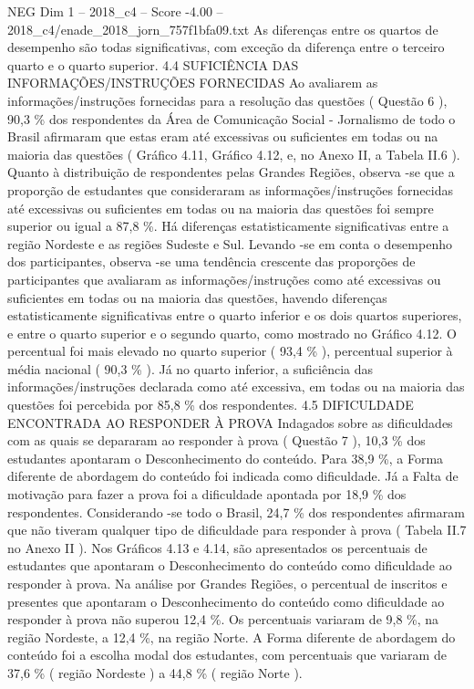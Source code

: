 \begin{textsample}{NEG Dim 1 – 2018\_c4 – Score -4.00 – 2018\_c4/enade\_2018\_jorn\_757f1bfa09.txt}
As diferenças entre os quartos de desempenho são todas significativas, com exceção da diferença entre o terceiro quarto e o quarto superior. 4.4 SUFICIÊNCIA DAS INFORMAÇÕES/INSTRUÇÕES FORNECIDAS Ao avaliarem as informações/instruções fornecidas para a resolução das questões ( Questão 6 ), 90,3 \% dos respondentes da Área de Comunicação Social - Jornalismo de todo o Brasil afirmaram que estas eram até excessivas ou suficientes em todas ou na maioria das questões ( Gráfico 4.11, Gráfico 4.12, e, no Anexo II, a Tabela II.6 ).
Quanto à distribuição de respondentes pelas Grandes Regiões, observa -se que a proporção de estudantes que consideraram as informações/instruções fornecidas até excessivas ou suficientes em todas ou na maioria das questões foi sempre superior ou igual a 87,8 \%.
Há diferenças estatisticamente significativas entre a região Nordeste e as regiões Sudeste e Sul.
Levando -se em conta o desempenho dos participantes, observa -se uma tendência crescente das proporções de participantes que avaliaram as informações/instruções como até excessivas ou suficientes em todas ou na maioria das questões, havendo diferenças estatisticamente significativas entre o quarto inferior e os dois quartos superiores, e entre o quarto superior e o segundo quarto, como mostrado no Gráfico 4.12.
O percentual foi mais elevado no quarto superior ( 93,4 \% ), percentual superior à média nacional ( 90,3 \% ).
Já no quarto inferior, a suficiência das informações/instruções declarada como até excessiva, em todas ou na maioria das questões foi percebida por 85,8 \% dos respondentes. 4.5 DIFICULDADE ENCONTRADA AO RESPONDER À PROVA Indagados sobre as dificuldades com as quais se depararam ao responder à prova ( Questão 7 ), 10,3 \% dos estudantes apontaram o Desconhecimento do conteúdo.
Para 38,9 \%, a Forma diferente de abordagem do conteúdo foi indicada como dificuldade.
Já a Falta de motivação para fazer a prova foi a dificuldade apontada por 18,9 \% dos respondentes.
Considerando -se todo o Brasil, 24,7 \% dos respondentes afirmaram que não tiveram qualquer tipo de dificuldade para responder à prova ( Tabela II.7 no Anexo II ).
Nos Gráficos 4.13 e 4.14, são apresentados os percentuais de estudantes que apontaram o Desconhecimento do conteúdo como dificuldade ao responder à prova.
Na análise por Grandes Regiões, o percentual de inscritos e presentes que apontaram o Desconhecimento do conteúdo como dificuldade ao responder à prova não superou 12,4 \%.
Os percentuais variaram de 9,8 \%, na região Nordeste, a 12,4 \%, na região Norte.
A Forma diferente de abordagem do conteúdo foi a escolha modal dos estudantes, com percentuais que variaram de 37,6 \% ( região Nordeste ) a 44,8 \% ( região Norte ).

\end{textsample}
